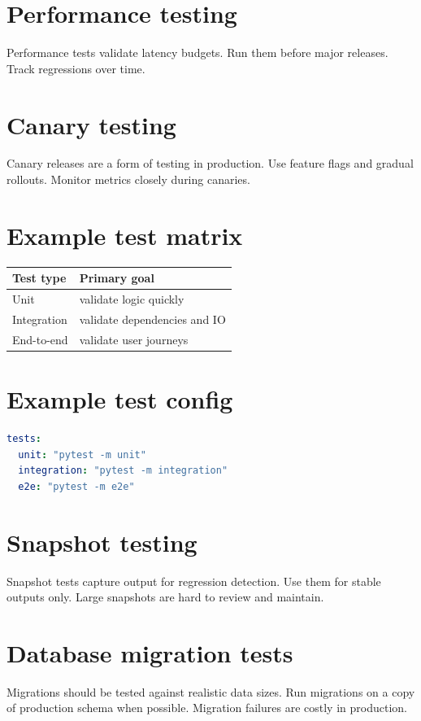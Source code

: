 \section{Performance testing}
Performance tests validate latency budgets.
Run them before major releases.
Track regressions over time.

\section{Canary testing}
Canary releases are a form of testing in production.
Use feature flags and gradual rollouts.
Monitor metrics closely during canaries.

\section{Example test matrix}
\begin{tabularx}{\textwidth}{@{}lX@{}}
\toprule
Test type & Primary goal \\
\midrule
Unit & validate logic quickly \\
Integration & validate dependencies and IO \\
End-to-end & validate user journeys \\
\bottomrule
\end{tabularx}

\section{Example test config}
\begin{lstlisting}[language=YAML]
tests:
  unit: "pytest -m unit"
  integration: "pytest -m integration"
  e2e: "pytest -m e2e"
\end{lstlisting}

\section{Snapshot testing}
Snapshot tests capture output for regression detection.
Use them for stable outputs only.
Large snapshots are hard to review and maintain.

\section{Database migration tests}
Migrations should be tested against realistic data sizes.
Run migrations on a copy of production schema when possible.
Migration failures are costly in production.

